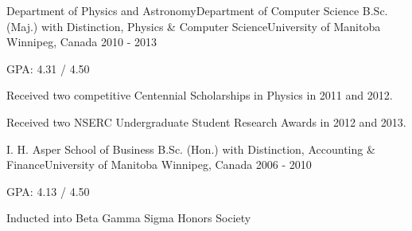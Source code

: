 \begin{cventries}
  \cventry
    {Department of Physics and Astronomy{\enskip\cdotp\enskip}Department of Computer Science} %
    {B.Sc. (Maj.) with Distinction, Physics \& Computer Science{\enskip\cdotp\enskip}University of Manitoba} %
    {Winnipeg, Canada} %
    {2010 - 2013} %
    {
      \begin{cvitems} %
        \item {GPA: 4.31 / 4.50}
        \item {Received two competitive Centennial Scholarships in Physics in 2011 and 2012.}
        \item {Received two NSERC Undergraduate Student Research Awards in 2012 and 2013.}
      \end{cvitems}
    }

  \cventry
    {I. H. Asper School of Business} %
    {B.Sc. (Hon.) with Distinction, Accounting \& Finance{\enskip\cdotp\enskip}University of Manitoba} %
    {Winnipeg, Canada} %
    {2006 - 2010} %
    {
      \begin{cvitems} %
        \item {GPA: 4.13 / 4.50}
        \item {Inducted into Beta Gamma Sigma Honors Society}
      \end{cvitems}
    }

\end{cventries}
